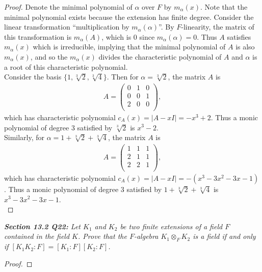 \documentclass{article}
\begin{document}
  \begin{proof}
    Denote the minimal polynomial of $\alpha$ over $F$ by $m_\alpha(x)$.
    Note that the minimal polynomial exists because the extension has
    finite degree. Consider the linear transformation ``multiplication by
    $m_\alpha(\alpha)$''. By $F$-linearity, the matrix of this
    transformation is $m_\alpha(A)$, which is 0 since $m_\alpha(\alpha)=0$.
    Thus $A$ satisfies $m_\alpha(x)$ which is irreducible, implying that
    the minimal polynomial of $A$ is also $m_\alpha(x)$, and so the
    $m_\alpha(x)$ divides the characteristic polynomial of $A$ and $\alpha$
    is a root of this characteristic polynomial. \\

    Consider the basis $\{1,\sqrt[3]{2},\sqrt[3]{4}\}$. Then for
    $\alpha=\sqrt[3]{2}$, the matrix $A$ is
    \begin{align*}
      A =
      \begin{pmatrix}
        0&1&0\\
        0&0&1\\
        2&0&0\\
      \end{pmatrix},
    \end{align*}
    which has characteristic polynomial $c_A(x)=|A-xI|=-x^3+2$. Thus a
    monic polynomial of degree 3 satisfied by $\sqrt[3]{2}$ is $x^3-2$. \\

    Similarly, for $\alpha=1+\sqrt[3]{2}+\sqrt[3]{4}$, the matrix $A$ is
    \begin{align*}
      A =
      \begin{pmatrix}
        1&1&1\\
        2&1&1\\
        2&2&1\\
      \end{pmatrix},
    \end{align*}
    which has characteristic polynomial $c_A(x)=|A-xI|=-(x^3-3x^2-3x-1)$.
    Thus a monic polynomial of degree 3 satisfied by
    $1+\sqrt[3]{2}+\sqrt[3]{4}$ is $x^3-3x^2-3x-1$. \\
  \end{proof}

\it \textbf{Section 13.2 Q22:} Let $K_1$ and $K_2$ be two finite extensions
  of a field $F$ contained in the field $K$. Prove that the $F$-algebra
  $K_1\otimes_F K_2$ is a field if and only if $[K_1K_2:F]=[K_1:F][K_2:F]$.

  \begin{proof}
  \end{proof}
\end{document}

